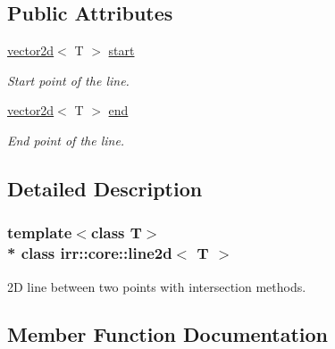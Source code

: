 \subsection*{Public Attributes}
\begin{DoxyCompactItemize}
\item 
\hyperlink{classirr_1_1core_1_1vector2d}{vector2d}$<$ T $>$ \hyperlink{classirr_1_1core_1_1line2d_ae9a3be281b33b15eb7de868b51651ad8}{start}\hypertarget{classirr_1_1core_1_1line2d_ae9a3be281b33b15eb7de868b51651ad8}{}\label{classirr_1_1core_1_1line2d_ae9a3be281b33b15eb7de868b51651ad8}

\begin{DoxyCompactList}\small\item\em Start point of the line. \end{DoxyCompactList}\item 
\hyperlink{classirr_1_1core_1_1vector2d}{vector2d}$<$ T $>$ \hyperlink{classirr_1_1core_1_1line2d_a339c443c3be2c006ac2f616a773f2863}{end}\hypertarget{classirr_1_1core_1_1line2d_a339c443c3be2c006ac2f616a773f2863}{}\label{classirr_1_1core_1_1line2d_a339c443c3be2c006ac2f616a773f2863}

\begin{DoxyCompactList}\small\item\em End point of the line. \end{DoxyCompactList}\end{DoxyCompactItemize}


\subsection{Detailed Description}
\subsubsection*{template$<$class T$>$\\*
class irr\+::core\+::line2d$<$ T $>$}

2D line between two points with intersection methods. 

\subsection{Member Function Documentation}
